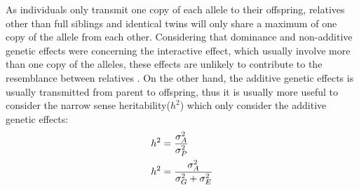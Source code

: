 \documentclass[12pt]{book}
\begin{document}
	As individuals only transmit one copy of each allele to their offspring, relatives other than full siblings and identical twins will only share a maximum of one copy of the allele from each other.
	Considering that dominance and non-additive genetic effects were concerning the interactive effect, which usually involve more than one copy of the alleles, these effects are unlikely to contribute to the resemblance between relatives \citep{Visscher2008}.
	On the other hand, the additive genetic effects is usually transmitted from parent to offspring, thus it is usually more useful to consider the narrow sense heritability($h^2$) which only consider the additive genetic effects:
	\begin{align}
	h^2&=\frac{\sigma_A^2}{\sigma_P^2} \notag\\
	h^2&=\frac{\sigma_A^2}{\sigma_G^2+\sigma_E^2}
	\label{eq:narrowHeritability}
	\end{align}
	
\end{document}
